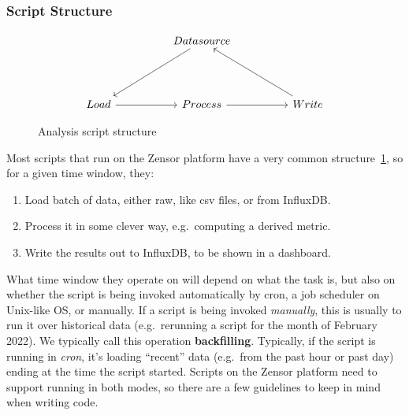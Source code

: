 \subsubsection{Script Structure}\label{subsection:script_structure}
\begin{figure}
	\[\begin{tikzcd}
		&& Datasource \\
		&& {} \\
		Load && Process && Write
		\arrow[from=3-1, to=3-3]
		\arrow[from=3-3, to=3-5]
		\arrow[from=1-3, to=3-1]
		\arrow[from=3-5, to=1-3]
	\end{tikzcd}\]
	\caption{Analysis script structure}
	\label{tik:analysis_script}
\end{figure}

Most scripts that run on the Zensor platform have a very common structure~\ref{tik:analysis_script}, so for a given time window, they:
\begin{enumerate}
	\item Load batch of data, either raw, like \acs{csv} files, or from InfluxDB.
	\item Process it in some clever way, e.g.\ computing a derived metric.
	\item Write the results out to InfluxDB, to be shown in a dashboard.
\end{enumerate}
What time window they operate on will depend on what the task is, but also on whether the script is being invoked automatically by cron, a job scheduler on Unix-like OS, or manually.
If a script is being invoked \textit{manually}, this is usually to run it over historical data (e.g.\ rerunning a script for the month of February 2022). We typically call this operation \textbf{backfilling}.
Typically, if the script is running in \textit{cron}, it's loading ``recent'' data (e.g.\ from the past hour or past day) ending at the time the script started.
Scripts on the Zensor platform need to support running in both modes, so there are a few guidelines to keep in mind when writing code.

